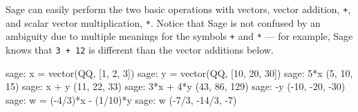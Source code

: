 Sage can easily perform the two basic operations with vectors, vector addition, \verb?+?,  and scalar vector multiplication, \verb?*?.  Notice that Sage is not confused by an ambiguity due to multiple meanings for the symbols \verb?+? and \verb?*? --- for example, Sage knows that \verb?3 + 12? is different than the vector additions below.
%
\begin{sageexample}
sage: x = vector(QQ, [1, 2, 3])
sage: y = vector(QQ, [10, 20, 30])
sage: 5*x
(5, 10, 15)
sage: x + y
(11, 22, 33)
sage: 3*x + 4*y
(43, 86, 129)
sage: -y
(-10, -20, -30)
sage: w = (-4/3)*x - (1/10)*y
sage: w
(-7/3, -14/3, -7)
\end{sageexample}
%
\begin{sageverbatim}
\end{sageverbatim}
%
